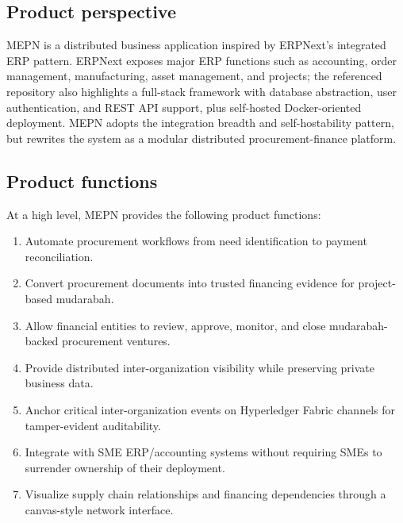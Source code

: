 \documentclass[11pt,a4paper]{article}
\newcommand{\systemshort}{MEPN}
\begin{document}
\subsection{Product perspective}
\systemshort{} is a distributed business application inspired by ERPNext's integrated ERP pattern. ERPNext exposes major ERP functions such as accounting, order management, manufacturing, asset management, and projects; the referenced repository also highlights a full-stack framework with database abstraction, user authentication, and REST API support, plus self-hosted Docker-oriented deployment. \systemshort{} adopts the integration breadth and self-hostability pattern, but rewrites the system as a modular distributed procurement-finance platform.

\subsection{Product functions}
At a high level, \systemshort{} provides the following product functions:
\begin{enumerate}
  \item Automate procurement workflows from need identification to payment reconciliation.
  \item Convert procurement documents into trusted financing evidence for project-based mudarabah.
  \item Allow financial entities to review, approve, monitor, and close mudarabah-backed procurement ventures.
  \item Provide distributed inter-organization visibility while preserving private business data.
  \item Anchor critical inter-organization events on Hyperledger Fabric channels for tamper-evident auditability.
  \item Integrate with SME ERP/accounting systems without requiring SMEs to surrender ownership of their deployment.
  \item Visualize supply chain relationships and financing dependencies through a canvas-style network interface.
\end{enumerate}
\end{document}
